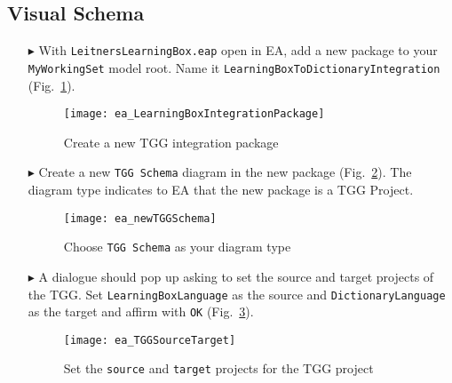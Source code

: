 \newpage
\hypertarget{schema vis}{}
\subsection{Visual Schema}
\visHeader

\begin{itemize}

\item[$\blacktriangleright$] With \texttt{LeitnersLearningBox.eap} open in EA, add a new package to your \texttt{MyWorkingSet} model root. Name it
\texttt{Learning\-Box\-To\-Dictionary\-Integration} (Fig.~\ref{ea:intgPackage}).

\vspace{0.5cm}

\begin{figure}[htbp]
\begin{center}
  \texttt{[image: ea\_LearningBoxIntegrationPackage]}
  \caption{Create a new TGG integration package}  
  \label{ea:intgPackage}
\end{center}
\end{figure}

\item[$\blacktriangleright$] Create a new  \texttt{TGG Schema} diagram in the new package (Fig.~\ref{ea:tgg_diagram_type}). The diagram type indicates to EA
that the new package is a TGG Project.

\vspace{0.5cm}

\begin{figure}[htbp]
\begin{center}
  \texttt{[image: ea\_newTGGSchema]}
  \caption{Choose \texttt{TGG Schema} as your diagram type}  
  \label{ea:tgg_diagram_type}
\end{center}
\end{figure}

\item[$\blacktriangleright$] A dialogue should pop up asking to set the source and target projects of the TGG. Set \texttt{Learning\-Box\-Language} as the
source and \texttt{Dictionary\-Language} as the target and affirm with \texttt{OK} (Fig.~\ref{ea:select_source_target}).

\vspace{0.5cm}

\begin{figure}[htbp]
\begin{center}
  \texttt{[image: ea\_TGGSourceTarget]}
  \caption{Set the \texttt{source} and \texttt{target} projects for the TGG project}  
  \label{ea:select_source_target}
\end{center}
\end{figure}


\end{itemize}
